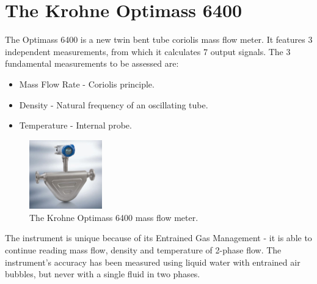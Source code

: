 \documentclass{report}
\begin{document}
\FloatBarrier
\section{The Krohne Optimass 6400}
The Optimass 6400 is a new twin bent tube coriolis mass flow meter. It features 3 independent measurements, from which it calculates 7 output signals. The 3 fundamental measurements to be assessed are:
\begin{itemize}
\item{Mass Flow Rate - Coriolis principle.}
\item{Density - Natural frequency of an oscillating tube.}
\item{Temperature - Internal probe.}
\end{itemize}
\begin{figure}
\vspace{-4cm}
\begin{center}
\includegraphics[width=0.28\textwidth]{Optimass6400}
\end{center}
\caption{The Krohne Optimass 6400 mass flow meter.} %
\label{fig:optimass6400}
\end{figure}
\FloatBarrier
The instrument is unique because of its Entrained Gas Management - it is able to continue reading mass flow, density and temperature of 2-phase flow. \cite{processArticle} The instrument's accuracy has been measured using liquid water with entrained air bubbles, but never with a single fluid in two phases. 
\end{document}
